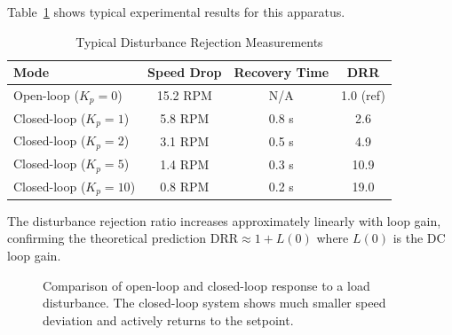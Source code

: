 Table~\ref{tab:drr_results} shows typical experimental results for this apparatus.

\begin{table}[htbp]
\centering
\caption{Typical Disturbance Rejection Measurements}
\label{tab:drr_results}
\begin{tabular}{lccc}
\toprule
\textbf{Mode} & \textbf{Speed Drop} & \textbf{Recovery Time} & \textbf{DRR} \\
\midrule
Open-loop ($K_p = 0$) & 15.2 RPM & N/A & 1.0 (ref) \\
Closed-loop ($K_p = 1$) & 5.8 RPM & 0.8 s & 2.6 \\
Closed-loop ($K_p = 2$) & 3.1 RPM & 0.5 s & 4.9 \\
Closed-loop ($K_p = 5$) & 1.4 RPM & 0.3 s & 10.9 \\
Closed-loop ($K_p = 10$) & 0.8 RPM & 0.2 s & 19.0 \\
\bottomrule
\end{tabular}
\end{table}

The disturbance rejection ratio increases approximately linearly with loop gain, confirming the theoretical prediction $\text{DRR} \approx 1 + L(0)$ where $L(0)$ is the DC loop gain.

\begin{figure}[htbp]
\centering
{}
\caption{Comparison of open-loop and closed-loop response to a load disturbance. The closed-loop system shows much smaller speed deviation and actively returns to the setpoint.}
\label{fig:disturbance_comparison}
\end{figure}

